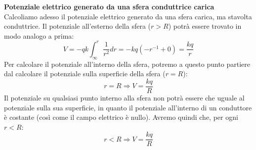 \documentclass[a4paper,12pt]{article}
\begin{document}
\par\smallskip
\textbf{Potenziale elettrico generato da una sfera conduttrice carica} \\
Calcoliamo adesso il potenziale elettrico generato da una sfera carica, ma stavolta conduttrice. Il potenziale all'esterno della sfera ($r>R$) potrà essere trovato in modo analogo a prima:
$$ V = -qk\int_\infty^r \frac{1}{r^2} dr = -kq(-r^{-1} + 0) = \frac{kq}{r} $$
Per calcolare il potenziale all'interno della sfera, potremo a questo punto partiere dal calcolare il potenziale sulla superficie della sfera ($r=R$):
$$ r = R \Rightarrow V = \frac{kq}{R} $$
Il potenziale su qualsiasi punto interno alla sfera non potrà essere che uguale al potenziale sulla sua superficie, in quanto il potenziale all'interno di un conduttore è costante (così come il campo elettrico è nullo).
Avremo quindi che, per ogni $r <R$:
$$ r < R \Rightarrow V = \frac{kq}{R} $$
\end{document}
